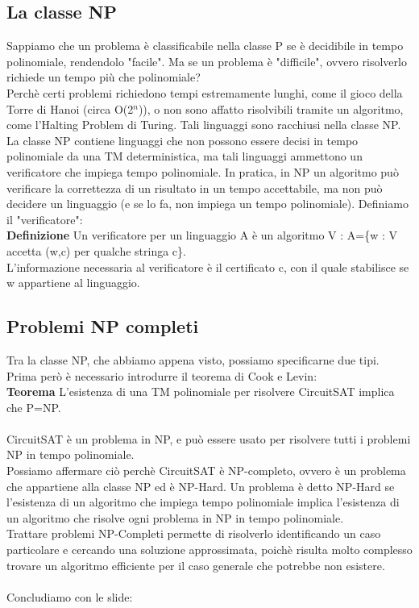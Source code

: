 \documentclass[]{article}
\begin{document}
		\subsection{La classe NP}
			Sappiamo che un problema è classificabile nella classe P se è decidibile in tempo polinomiale, rendendolo "facile". Ma se un problema è "difficile", ovvero risolverlo richiede un tempo più che polinomiale?\\
			Perchè certi problemi richiedono tempi estremamente lunghi, come il gioco della Torre di Hanoi (circa O(2$^n$)), o non sono affatto risolvibili tramite un algoritmo, come l'Halting Problem di Turing. Tali linguaggi sono racchiusi nella classe NP.\\
			La classe NP contiene linguaggi che non possono essere decisi in tempo polinomiale da una TM deterministica, ma tali linguaggi ammettono un verificatore che impiega tempo polinomiale. In pratica, in NP un algoritmo può verificare la correttezza di un risultato in un tempo accettabile, ma non può decidere un linguaggio (e se lo fa, non impiega un tempo polinomiale). Definiamo il "verificatore":\\
			\textbf{Definizione} Un verificatore per un linguaggio A è un algoritmo V : A=\{w : V accetta (w,c) per qualche stringa c\}.\\
			L'informazione necessaria al verificatore è il certificato c, con il quale stabilisce se w appartiene al linguaggio.
		\subsection{Problemi NP completi}
			Tra la classe NP, che abbiamo appena visto, possiamo specificarne due tipi. Prima però è necessario introdurre il teorema di Cook e Levin:\\
			\textbf{Teorema} L'esistenza di una TM polinomiale per risolvere CircuitSAT implica che P=NP.\\\\
			CircuitSAT è un problema in NP, e può essere usato per risolvere tutti i problemi NP in tempo polinomiale.\\
			Possiamo affermare ciò perchè CircuitSAT è NP-completo, ovvero è un problema che appartiene alla classe NP ed è NP-Hard. Un problema è detto NP-Hard se l'esistenza di un algoritmo che impiega tempo polinomiale implica l'esistenza di un algoritmo che risolve ogni problema in NP in tempo polinomiale.\\
			Trattare problemi NP-Completi permette di risolverlo identificando un caso particolare e cercando una soluzione approssimata, poichè risulta molto complesso trovare un algoritmo efficiente per il caso generale che potrebbe non esistere.\\\\
			Concludiamo con le slide:
			
\end{document}

